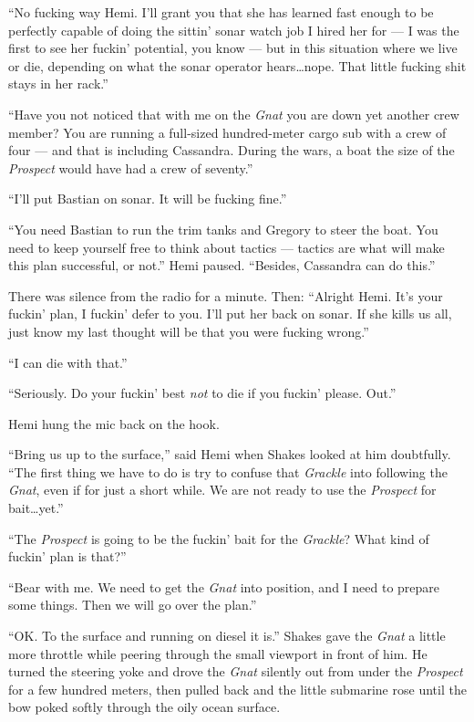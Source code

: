 \documentclass[
]{scrbook}
\begin{document}
``No fucking way Hemi. I'll grant you that she has learned fast enough
to be perfectly capable of doing the sittin' sonar watch job I hired her
for --- I was the first to see her fuckin' potential, you know --- but
in this situation where we live or die, depending on what the sonar
operator hears\ldots nope. That little fucking shit stays in her rack.''

``Have you not noticed that with me on the \emph{Gnat} you are down yet
another crew member? You are running a full-sized hundred-meter cargo
sub with a crew of four --- and that is including Cassandra. During the
wars, a boat the size of the \emph{Prospect} would have had a crew of
seventy.''

``I'll put Bastian on sonar. It will be fucking fine.''

``You need Bastian to run the trim tanks and Gregory to steer the boat.
You need to keep yourself free to think about tactics --- tactics are
what will make this plan successful, or not.'' Hemi paused. ``Besides,
Cassandra can do this.''

There was silence from the radio for a minute. Then: ``Alright Hemi.
It's your fuckin' plan, I fuckin' defer to you. I'll put her back on
sonar. If she kills us all, just know my last thought will be that you
were fucking wrong.''

``I can die with that.''

``Seriously. Do your fuckin' best \emph{not} to die if you fuckin'
please. Out.''

Hemi hung the mic back on the hook.

``Bring us up to the surface,'' said Hemi when Shakes looked at him
doubtfully. ``The first thing we have to do is try to confuse that
\emph{Grackle} into following the \emph{Gnat}, even if for just a short
while. We are not ready to use the \emph{Prospect} for bait\ldots yet.''

``The \emph{Prospect} is going to be the fuckin' bait for the
\emph{Grackle}? What kind of fuckin' plan is that?''

``Bear with me. We need to get the \emph{Gnat} into position, and I need
to prepare some things. Then we will go over the plan.''

``OK. To the surface and running on diesel it is.'' Shakes gave the
\emph{Gnat} a little more throttle while peering through the small
viewport in front of him. He turned the steering yoke and drove the
\emph{Gnat} silently out from under the \emph{Prospect} for a few
hundred meters, then pulled back and the little submarine rose until the
bow poked softly through the oily ocean surface.
\end{document}

